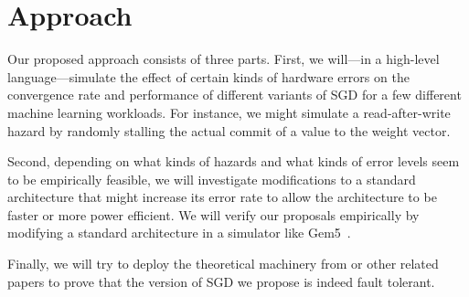 \documentclass[12pt,leqno,twoside]{article}
\begin{document}
\section{Approach}

Our proposed approach consists of three parts.  First, we will---in
a high-level language---simulate the effect of certain kinds of
hardware errors on the convergence rate and performance of different
variants of SGD for a few different machine learning workloads. For
instance, we might simulate a read-after-write hazard by randomly
stalling the actual commit of a value to the weight vector.

Second, depending on what kinds of hazards and what kinds of error
levels seem to be empirically feasible, we will investigate
modifications to a standard architecture that might increase its
error rate to allow the architecture to be faster or more power
efficient. We will verify our proposals empirically by modifying a
standard architecture in a simulator like Gem5~\citep{gem5}.

Finally, we will try to deploy the theoretical machinery from
\citet{niu11hogwild} or other related papers to prove that the
version of SGD we propose is indeed fault tolerant.


 
\end{document}
